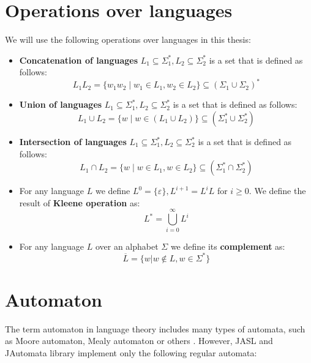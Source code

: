 \documentclass{ctuthesis}
\begin{document}
\section{Operations over languages}
\label{sec:operations-languages-def}
We will use the following operations over languages in this thesis:
\begin{itemize}
	\item \textbf{Concatenation of languages} $L_1 \subseteq \Sigma^*_1, L_2 \subseteq \Sigma^*_2$ is a set that is defined as follows:
	\begin{equation*}
		L_1L_2 = \{w_1w_2 \mid w_1 \in L_1, w_2 \in L_2\} \subseteq (\Sigma_1 \cup \Sigma_2)^*
	\end{equation*}
	
	\item \textbf{Union of languages} $L_1 \subseteq \Sigma^*_1, L_2 \subseteq \Sigma^*_2$ is a set that is defined as follows:
	\begin{equation*}
		L_1\cup L_2 = \{w \mid w \in (L_1 \cup L_2) \} \subseteq (\Sigma_1^* \cup \Sigma_2^*)
	\end{equation*}
	
	\item \textbf{Intersection of languages} $L_1 \subseteq \Sigma^*_1, L_2 \subseteq \Sigma^*_2$ is a set that is defined as follows:
	\begin{equation*}
		L_1 \cap L_2 = \{w \mid w \in L_1, w \in L_2 \} \subseteq (\Sigma^*_1 \cap \Sigma^*_2)
	\end{equation*}
	
	\item For any language $L$ we define $L^0 = \{\varepsilon\}, L^{i+1} = L^iL$ for $i \geq 0$. We define the result of \textbf{Kleene operation} as:
	\begin{equation*}
		L^* = \bigcup^{\infty}_{i=0} L^i
	\end{equation*}
	
	\item For any language $L$ over an alphabet $\Sigma$ we define its \textbf{complement} as: 
	\begin{equation*}
		\overline{L} = \{w | w \not \in L, w \in \Sigma^*\}
	\end{equation*}
\end{itemize}

\section{Automaton}
\label{sec:automaton-def}
The term automaton in language theory includes many types of automata, such as Moore automaton, Mealy automaton or others \cite{melichar}. However, JASL and JAutomata library implement only the following regular automata:
\end{document}
